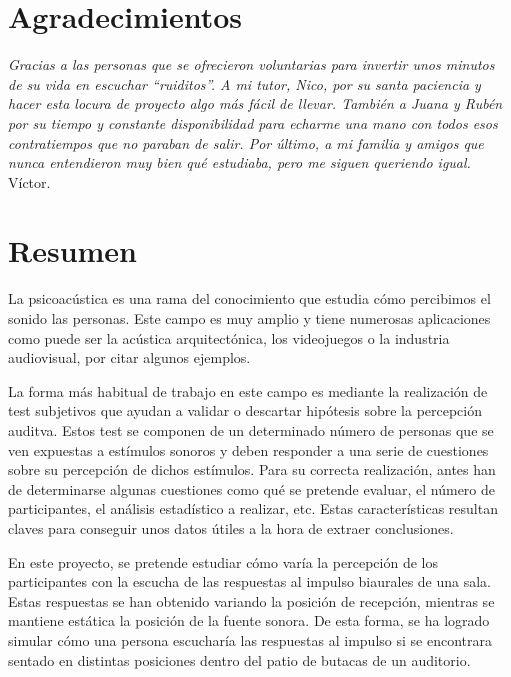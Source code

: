 \documentclass[11pt,a4paper]{book}
\author{Víctor de Tejada Molera}
\begin{document}

\newpage
\thispagestyle{empty}
\mbox{}
\newpage

\newpage
\thispagestyle{empty}
\mbox{}
\newpage
\chapter*{Agradecimientos}
    \thispagestyle{empty}
    \begin{flushright}
        \textit{Gracias a las personas que se ofrecieron voluntarias para invertir unos minutos de su vida en escuchar ``ruiditos''. A mi tutor, Nico, por su santa paciencia y hacer esta locura de proyecto algo más fácil de llevar. También a Juana y Rubén por su tiempo y constante disponibilidad para echarme una mano con todos esos contratiempos que no paraban de salir. Por último, a mi familia y amigos que nunca entendieron muy bien qué estudiaba, pero me siguen queriendo igual.}\\ Víctor.
    \end{flushright}
    

\chapter*{Resumen}
    La psicoacústica es una rama del conocimiento que estudia cómo percibimos el sonido las personas. Este campo es muy amplio y tiene numerosas aplicaciones como puede ser la acústica arquitectónica, los videojuegos o la industria audiovisual, por citar algunos ejemplos.

    La forma más habitual de trabajo en este campo es mediante la realización de test subjetivos que ayudan a validar o descartar hipótesis sobre la percepción auditva. Estos test se componen de un determinado número de personas que se ven expuestas a estímulos sonoros y deben responder a una serie de cuestiones sobre su percepción de dichos estímulos. Para su correcta realización, antes han de determinarse algunas cuestiones como qué se pretende evaluar, el número de participantes, el análisis estadístico a realizar, etc. Estas características resultan claves para conseguir unos datos útiles a la hora de extraer conclusiones.

    En este proyecto, se pretende estudiar cómo varía la percepción de los participantes con la escucha de las respuestas al impulso biaurales de una sala. Estas respuestas se han obtenido variando la posición de recepción, mientras se mantiene estática la posición de la fuente sonora. De esta forma, se ha logrado simular cómo una persona escucharía las respuestas al impulso si se encontrara sentado en distintas posiciones dentro del patio de butacas de un auditorio.
\end{document}
